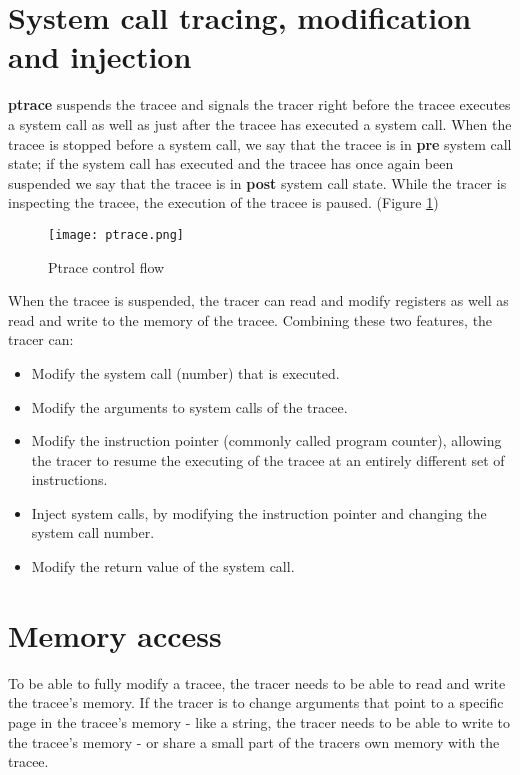 \documentclass[a4paper, 10pt]{report}
\begin{document}
\section{System call tracing, modification and injection}

\textbf{ptrace} suspends the tracee and signals the tracer right before
the tracee executes a system call as well as just after the tracee has
executed a system call. When the tracee is stopped before a system call,
we say that the tracee is in \textbf{pre} system call state; if the system
call has executed and the tracee has once again
been suspended we say that the tracee is in \textbf{post} system call state.
While the tracer is inspecting the tracee, the execution of the
tracee is paused. (Figure \ref{fig1})


\begin{figure}
\texttt{[image: ptrace.png]}
\caption{Ptrace control flow}
\label{fig1}
\end{figure}

When the tracee is suspended, the tracer can read and modify registers as well
as read and write to the memory of the tracee. Combining these two features,
the tracer can:

\begin{itemize}
\item Modify the system call (number) that is executed.
\item Modify the arguments to system calls of the tracee.
\item Modify the instruction pointer (commonly called program counter), allowing
    the tracer to resume the executing of the tracee at an entirely
    different set of instructions.
\item Inject system calls, by modifying the instruction pointer and changing the
    system call number.
\item Modify the return value of the system call.
\end{itemize}

\section{Memory access}

To be able to fully modify a tracee, the tracer needs to be able to
read and write the tracee's memory. If the tracer is to change
arguments that point to a specific page in the tracee's memory - like a string,
the tracer needs to be able to write to the tracee's memory - or
share a small part of the tracers own memory with the tracee.
\end{document}
